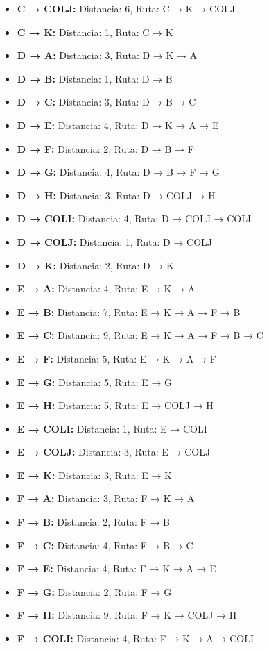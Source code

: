 \documentclass[12pt]{article}
\begin{document}
\begin{itemize}
\item \textbf{C → COLJ:} Distancia: 6, Ruta: C → K → COLJ
\item \textbf{C → K:} Distancia: 1, Ruta: C → K
\item \textbf{D → A:} Distancia: 3, Ruta: D → K → A
\item \textbf{D → B:} Distancia: 1, Ruta: D → B
\item \textbf{D → C:} Distancia: 3, Ruta: D → B → C
\item \textbf{D → E:} Distancia: 4, Ruta: D → K → A → E
\item \textbf{D → F:} Distancia: 2, Ruta: D → B → F
\item \textbf{D → G:} Distancia: 4, Ruta: D → B → F → G
\item \textbf{D → H:} Distancia: 3, Ruta: D → COLJ → H
\item \textbf{D → COLI:} Distancia: 4, Ruta: D → COLJ → COLI
\item \textbf{D → COLJ:} Distancia: 1, Ruta: D → COLJ
\item \textbf{D → K:} Distancia: 2, Ruta: D → K
\item \textbf{E → A:} Distancia: 4, Ruta: E → K → A
\item \textbf{E → B:} Distancia: 7, Ruta: E → K → A → F → B
\item \textbf{E → C:} Distancia: 9, Ruta: E → K → A → F → B → C
\item \textbf{E → F:} Distancia: 5, Ruta: E → K → A → F
\item \textbf{E → G:} Distancia: 5, Ruta: E → G
\item \textbf{E → H:} Distancia: 5, Ruta: E → COLJ → H
\item \textbf{E → COLI:} Distancia: 1, Ruta: E → COLI
\item \textbf{E → COLJ:} Distancia: 3, Ruta: E → COLJ
\item \textbf{E → K:} Distancia: 3, Ruta: E → K
\item \textbf{F → A:} Distancia: 3, Ruta: F → K → A
\item \textbf{F → B:} Distancia: 2, Ruta: F → B
\item \textbf{F → C:} Distancia: 4, Ruta: F → B → C
\item \textbf{F → E:} Distancia: 4, Ruta: F → K → A → E
\item \textbf{F → G:} Distancia: 2, Ruta: F → G
\item \textbf{F → H:} Distancia: 9, Ruta: F → K → COLJ → H
\item \textbf{F → COLI:} Distancia: 4, Ruta: F → K → A → COLI

\end{itemize}
\end{document}
